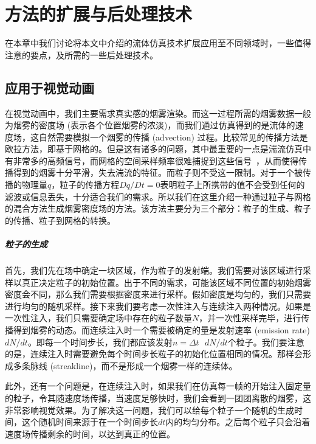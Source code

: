 \chapter{方法的扩展与后处理技术}
\label{chap:caa}

在本章中我们讨论将本文中介绍的流体仿真技术扩展应用至不同领域时，一些值得注意的要点，及所需的一些后处理技术。

\section{应用于视觉动画}
在视觉动画中，我们主要需求真实感的烟雾渲染。而这一过程所需的烟雾数据一般为烟雾的密度场 (表示各个位置烟雾的浓淡)，而我们通过仿真得到的是流体的速度场，这自然需要模拟一个烟雾的传播 (advection) 过程。比较常见的传播方法是欧拉方法，即基于网格的。但是这有诸多的问题，其中最重要的一点是湍流仿真中有非常多的高频信号，而网格的空间采样频率很难捕捉到这些信号~\cite{bridson2015fluid}，从而使得传播得到的烟雾十分平滑，失去湍流的特征。而粒子则不受这一限制。对于一个被传播的物理量$q$，粒子的传播方程$Dq/Dt=0$表明粒子上所携带的值不会受到任何的滤波或信息丢失，十分适合我们的需求。所以我们在这里介绍一种通过粒子与网格的混合方法生成烟雾密度场的方法。该方法主要分为三个部分：粒子的生成、粒子的传播、粒子到网格的转换。

\paragraph{粒子的生成}
首先，我们先在场中确定一块区域，作为粒子的发射端。我们需要对该区域进行采样以真正决定粒子的初始位置。出于不同的需求，可能该区域不同位置的初始烟雾密度会不同，那么我们需要根据密度来进行采样。假如密度是均匀的，我们只需要进行均匀的随机采样。接下来我们要考虑一次性注入与连续注入两种情况。如果是一次性注入，我们只需要确定场中存在的粒子数量$N$，并一次性采样完毕，进行传播得到烟雾的动态。而连续注入时一个需要被确定的量是发射速率 (emission rate) $d$$N/dt$。即每一个时间步长，我们都应该发射$n=\Delta t \text{ }$$d$$N/dt$个粒子。我们要注意的是，连续注入时需要避免每个时间步长粒子的初始化位置相同的情况。那样会形成多条脉线 (streakline)，而不是形成一个烟雾一样的连续体。

此外，还有一个问题是，在连续注入时，如果我们在仿真每一帧的开始注入固定量的粒子，令其随速度场传播，当速度足够快时，我们会看到一团团离散的烟雾，这非常影响视觉效果。为了解决这一问题，我们可以给每个粒子一个随机的生成时间，这个随机时间来源于在一个时间步长$dt$内的均匀分布。之后每个粒子只会沿着速度场传播剩余的时间，以达到真正的位置。


